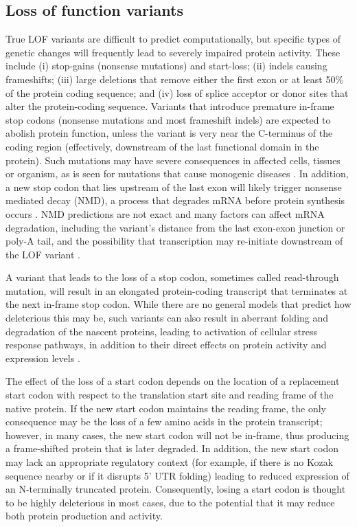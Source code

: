 \subsection{Loss of function variants}

True LOF variants are difficult to predict computationally, but specific types of genetic changes will frequently lead to severely impaired protein activity. These include (i) stop-gains (nonsense mutations) and start-loss; (ii) indels causing frameshifts; (iii) large deletions that remove either the first exon or at least 50\% of the protein coding sequence; and (iv) loss of splice acceptor or donor sites that alter the protein-coding sequence. Variants that introduce premature in-frame stop codons (nonsense mutations and most frameshift indels) are expected to abolish protein function, unless the variant is very near the C-terminus of the coding region \cite{yamaguchi2008distribution} (effectively, downstream of the last functional domain in the protein). Such mutations may have severe consequences in affected cells, tissues or organism, as is seen for mutations that cause monogenic diseases \cite{scheper2007translation}. In addition, a new stop codon that lies upstream of the last exon will likely trigger nonsense mediated decay (NMD), a process that degrades mRNA before protein synthesis occurs \cite{nagy1998rule}. NMD predictions are not exact and many factors can affect mRNA degradation, including the variant's distance from the last exon-exon junction or poly-A tail, and the possibility that transcription may re-initiate downstream of the LOF variant \cite{brogna2009nonsense}.

A variant that leads to the loss of a stop codon, sometimes called read-through mutation, will result in an elongated protein-coding transcript that terminates at the next in-frame stop codon. While there are no general models that predict how deleterious this may be, such variants can also result in aberrant folding and degradation of the nascent proteins, leading to activation of cellular stress response pathways, in addition to their direct effects on protein activity and expression levels \cite{scheper2007translation}.

The effect of the loss of a start codon depends on the location of a replacement start codon with respect to the translation start site and reading frame of the native protein. If the new start codon maintains the reading frame, the only consequence may be the loss of a few amino acids in the protein transcript; however, in many cases, the new start codon will not be in-frame, thus producing a frame-shifted protein that is later degraded. In addition, the new start codon may lack an appropriate regulatory context (for example, if there is no Kozak sequence nearby or if it disrupts 5' UTR folding) leading to reduced expression of an N-terminally truncated protein. Consequently, losing a start codon is thought to be highly deleterious in most cases, due to the potential that it may reduce both protein production and activity.

